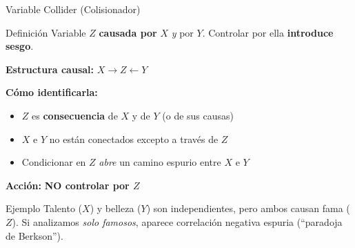 \documentclass[aspectratio=169,11pt]{beamer}
\newcommand{\highlight}[1]{\textcolor{uddlight}{\bfseries #1}}
\begin{document}
\begin{frame}{Variable Collider (Colisionador)}
\small
\begin{block}{Definici\'on}
    Variable $Z$ \textbf{causada por} $X$ \textit{y} por $Y$. Controlar por ella \textbf{introduce sesgo}.
\end{block}

\vspace{0.1cm}
\textbf{Estructura causal:} $X \rightarrow Z \leftarrow Y$

\vspace{0.1cm}
\textbf{C\'omo identificarla:}
\begin{itemize}
    \setlength{\itemsep}{1pt}
    \item $Z$ es \textbf{consecuencia} de $X$ y de $Y$ (o de sus causas)
    \item $X$ e $Y$ no est\'an conectados excepto a trav\'es de $Z$
    \item Condicionar en $Z$ \textit{abre} un camino espurio entre $X$ e $Y$
\end{itemize}

\vspace{0.1cm}
\textbf{Acci\'on:} \highlight{NO controlar por $Z$}

\vspace{0.1cm}
\begin{exampleblock}{Ejemplo}
    \scriptsize
    Talento ($X$) y belleza ($Y$) son independientes, pero ambos causan fama ($Z$). Si analizamos \textit{solo famosos}, aparece correlaci\'on negativa espuria (``paradoja de Berkson'').
\end{exampleblock}
\end{frame}
\end{document}
